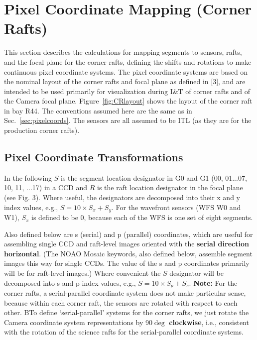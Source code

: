 \documentclass{article}[12pt]
\begin{document}
{%
%    

\section{Pixel Coordinate Mapping (Corner Rafts)\label{sec:crpixelcoords}}
This section describes the calculations for mapping segments to sensors, rafts, and the focal plane for the corner rafts, defining the shifts and rotations to make continuous pixel coordinate systems.  The pixel coordinate systems are based on the nominal layout of the corner rafts and focal plane as defined in [3], and are intended to be used primarily for visualization during I\&T of corner rafts and of the Camera focal plane.  Figure~\ref{fig:CRlayout} shows the layout of the corner raft in bay R44.  The conventions assumed here are the same as in Sec.~\ref{sec:pixelcoords}.  The sensors are all assumed to be ITL (as they are for the production corner rafts).

\subsection{Pixel Coordinate Transformations}
In the following $S$ is the segment location designator in G0 and G1 (00, 01...07, 10, 11, ...17) in a CCD and $R$ is the raft location designator in the focal plane (see Fig. 3).  Where useful, the designators are decomposed into their x and y index values, e.g., $S = 10 \times S_x + S_y$.  For the wavefront sensors (WFS W0 and W1), $S_x$ is defined to be 0, because each of the WFS is one set of eight segments.

Also defined below are s (serial) and p (parallel) coordinates, which are useful for assembling single CCD and raft-level images oriented with the {\bf serial direction horizontal}.  (The NOAO Mosaic keywords, also defined below, assemble segment images this way for single CCDs.  The value of the s and p coordinates primarily will be for raft-level images.)  Where convenient the $S$ designator will be decomposed into s and p index values, e.g., $S = 10 \times S_p + S_s$.  {\bf Note:}  For the corner rafts, a serial-parallel coordinate system does not make particular sense, because within each corner raft, the sensors are rotated with respect to each other.  BTo define `serial-parallel' systems for the corner rafts, we just rotate the Camera coordinate system representations by 90$\deg$ {\bf clockwise}, i.e., consistent with the rotation of the science rafts for the serial-parallel coordinate systems.

}
\end{document}
